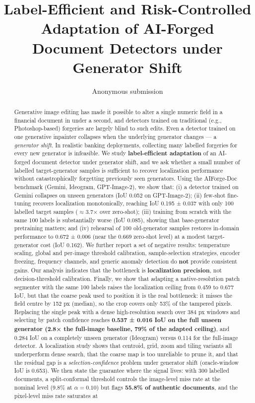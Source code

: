\documentclass[preprint,12pt]{elsarticle}
\begin{document}
\begin{frontmatter}
\title{Label-Efficient and Risk-Controlled Adaptation of AI-Forged Document Detectors under Generator Shift}
\author{Anonymous submission}
\address{Author names withheld for review}
\begin{abstract}
Generative image editing has made it possible to alter a single numeric field in a financial document in under a second, and detectors trained on traditional (e.g., Photoshop-based) forgeries are largely blind to such edits. Even a detector trained on one generative inpainter collapses when the underlying generator changes --- a \emph{generator shift}. In realistic banking deployments, collecting many labelled forgeries for every new generator is infeasible. We study \textbf{label-efficient adaptation} of an AI-forged document detector under generator shift, and we ask whether a small number of labelled target-generator samples is sufficient to recover localization performance without catastrophically forgetting previously seen generators. Using the AIForge-Doc benchmark (Gemini, Ideogram, GPT-Image-2), we show that: (i) a detector trained on Gemini collapses on unseen generators (IoU 0.052 on GPT-Image-2); (ii) few-shot fine-tuning recovers localization monotonically, reaching IoU 0.195 ± 0.037 with only 100 labelled target samples ($\approx$3.7× over zero-shot); (iii) training from scratch with the same 100 labels is substantially worse (IoU 0.085), showing that base-generator pretraining matters; and (iv) rehearsal of 100 old-generator samples restores in-domain performance to 0.672 ± 0.006 (near the 0.669 zero-shot level) at a modest target-generator cost (IoU 0.162). We further report a set of negative results: temperature scaling, global and per-image threshold calibration, sample-selection strategies, encoder freezing, frequency channels, and generic anomaly detection do \textbf{not} provide consistent gains. Our analysis indicates that the bottleneck is \textbf{localization precision}, not decision-threshold calibration. Finally, we show that adapting a native-resolution patch segmenter with the same 100 labels raises the localization ceiling from 0.459 to 0.677 IoU, but that the coarse peak used to position it is the real bottleneck: it misses the field centre by 152 px (median), so the crop covers only 53\% of the tampered pixels. Replacing the single peak with a dense high-resolution search over 384 px windows and selecting by patch confidence reaches \textbf{0.537 ± 0.016 IoU on the full unseen generator (2.8× the full-image baseline, 79\% of the adapted ceiling)}, and 0.284 IoU on a completely unseen generator (Ideogram) versus 0.114 for the full-image detector. A localization study shows that centroid, grid, zoom and tiling variants all underperform dense search, that the coarse map is too unreliable to prune it, and that the residual gap is a \emph{selection-confidence} problem under generator shift (oracle-window IoU is 0.653). We then state the guarantee where the signal lives: with 300 labelled documents, a split-conformal threshold controls the image-level miss rate at the nominal level (9.8\% at $\alpha=0.10$) but flags \textbf{55.8\% of authentic documents}, and the pixel-level miss rate saturates at 
\end{abstract}
\end{frontmatter}
\end{document}
